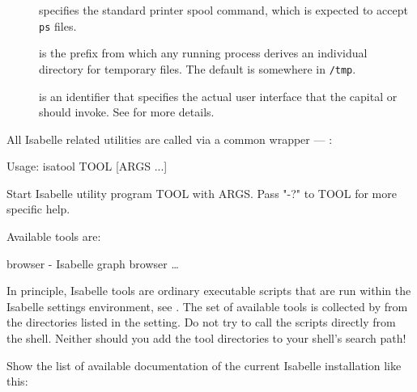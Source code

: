 \begin{isabellebody}
\begin{isamarkuptext}
\begin{description}
  \item[\hypertarget{setting.PRINT-COMMAND}{\hyperlink{setting.PRINT-COMMAND}{\mbox{}}}] specifies the standard printer
  spool command, which is expected to accept \verb|ps| files.
  
  \item[\hypertarget{setting.ISABELLE-TMP-PREFIX}{\hyperlink{setting.ISABELLE-TMP-PREFIX}{\mbox{}}}\isa{{\isachardoublequote}\isactrlsup {\isacharasterisk}{\isachardoublequote}}] is the
  prefix from which any running \hyperlink{executable.isabelle}{\mbox{}} process derives
  an individual directory for temporary files.  The default is
  somewhere in \verb|/tmp|.
  
  \item[\hypertarget{setting.ISABELLE-INTERFACE}{\hyperlink{setting.ISABELLE-INTERFACE}{\mbox{}}}] is an identifier that
  specifies the actual user interface that the capital \hyperlink{executable.Isabelle}{\mbox{}} or \hyperlink{executable.isabelle-interface}{\mbox{}} should invoke.  See
   for more details.

  \end{description}%
\end{isamarkuptext}%
\isamarkuptrue%
%
\isamarkuptrue%
%
\begin{isamarkuptext}%
All Isabelle related utilities are called via a common wrapper ---
  \hyperlink{executable.isatool}{\mbox{}}:

\begin{ttbox}
Usage: isatool TOOL [ARGS ...]

  Start Isabelle utility program TOOL with ARGS. Pass "-?" to TOOL
  for more specific help.

  Available tools are:

    browser - Isabelle graph browser
    \dots
\end{ttbox}

  In principle, Isabelle tools are ordinary executable scripts that
  are run within the Isabelle settings environment, see
  .  The set of available tools is collected by
  \hyperlink{executable.isatool}{\mbox{}} from the directories listed in the \hyperlink{setting.ISABELLE-TOOLS}{\mbox{}} setting.  Do not try to call the scripts directly
  from the shell.  Neither should you add the tool directories to your
  shell's search path!%
\end{isamarkuptext}%
\isamarkuptrue%
%
\isamarkuptrue%
%
\begin{isamarkuptext}%
Show the list of available documentation of the current Isabelle
  installation like this:


\end{isamarkuptext}
\end{isabellebody}
